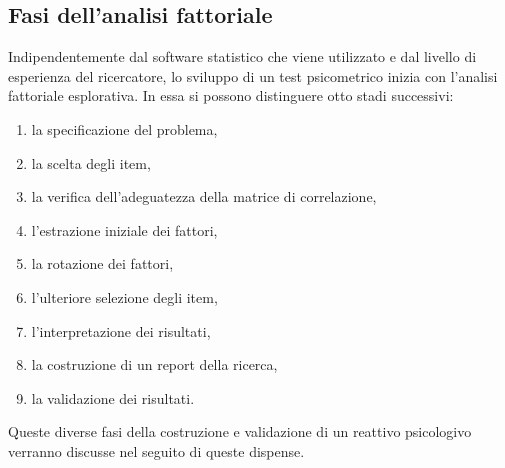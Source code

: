 \subsection{Fasi dell'analisi fattoriale}

Indipendentemente dal software statistico che viene utilizzato e dal livello di esperienza del ricercatore, lo sviluppo di un test psicometrico inizia con l'analisi fattoriale esplorativa. 
In essa si possono distinguere otto stadi successivi: 
\begin{enumerate}
\item la specificazione del problema, 
\item la scelta degli item, 
\item la verifica dell'adeguatezza della matrice di correlazione, 
\item l'estrazione iniziale dei fattori, 
\item la rotazione dei fattori, 
\item l'ulteriore selezione degli item, 
\item l'interpretazione dei risultati,
\item  la costruzione di un report della ricerca,
\item  la validazione dei risultati. 
\end{enumerate}
Queste diverse fasi della costruzione e validazione di un reattivo psicologivo verranno discusse nel seguito di queste dispense.

